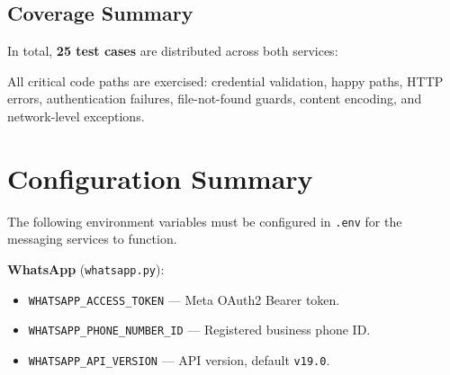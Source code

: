 \documentclass[12pt, a4paper]{article}
\begin{document}
\subsection{Coverage Summary}

In total, \textbf{25 test cases} are distributed across both services:

\begin{center}
\end{center}

All critical code paths are exercised: credential validation, happy paths,
HTTP errors, authentication failures, file-not-found guards, content
encoding, and network-level exceptions.

\section{Configuration Summary}

The following environment variables must be configured in \texttt{.env} for
the messaging services to function.

\textbf{WhatsApp} (\texttt{whatsapp.py}):
\begin{itemize}[leftmargin=1.5em, nosep]
  \item \texttt{WHATSAPP\_ACCESS\_TOKEN} — Meta OAuth2 Bearer token.
  \item \texttt{WHATSAPP\_PHONE\_NUMBER\_ID} — Registered business phone ID.
  \item \texttt{WHATSAPP\_API\_VERSION} — API version, default \texttt{v19.0}.
\end{itemize}
\end{document}
